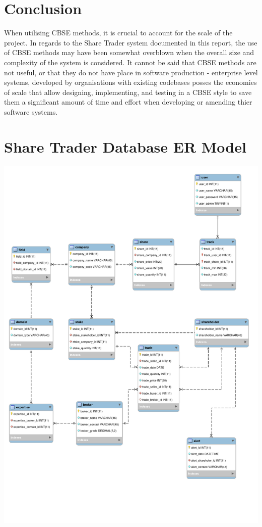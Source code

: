 \documentclass[12pt, a4paper,titlepage]{article}
\begin{document}
\section{Conclusion}
When utilising CBSE methods, it is crucial to account for the scale of the
project.  
In regards to the Share Trader system documented in this report, the use of
CBSE methods may have been somewhat overblown when the overall size and
complexity of the system is considered.  
It cannot be said that CBSE methods are not useful, or that they do not have
place in software production - enterprise level systems, developed by
organisations with existing codebases posses the economies of scale that allow
designing, implementing, and testing in a CBSE style to save them a
significant amount of time and effort when developing or amending thier software
systems. 


\clearpage




\appendix


\section{Share Trader Database ER Model}
\includegraphics[width=\textwidth]{res/share_trader_er.pdf}
\label{ap-schema}
\end{document}

